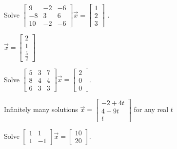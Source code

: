 \begin{exercise}
Solve
$\left[ \begin{smallmatrix}
9 & -2 & -6 \\
-8 & 3 & 6 \\
10 & -2 & -6
\end{smallmatrix} \right] \vec{x} =
\left[ \begin{smallmatrix}
1 \\
2 \\
3
\end{smallmatrix} \right]$ .
\end{exercise}
\comboSol{%
}
{%
$\vec{x} = \left[\begin{smallmatrix} 2 \\ 1 \\ \frac{5}{2} \end{smallmatrix}\right]$
}

\begin{exercise}
Solve
$\left[ \begin{smallmatrix}
5 & 3 & 7 \\
8 & 4 & 4 \\
6 & 3 & 3
\end{smallmatrix} \right] \vec{x} =
\left[ \begin{smallmatrix}
2 \\
0 \\
0
\end{smallmatrix} \right]$.
\end{exercise}
\comboSol{%
}
{%
Infinitely many solutions $\vec{x} = \left[\begin{smallmatrix} -2+4t \\ 4-9t \\ t \end{smallmatrix}\right]$ for any real $t$
}

\begin{exercise}\ansMark%
Solve
$\left[ \begin{smallmatrix}
1 & 1 \\
1 & -1
\end{smallmatrix}\right] \vec{x} = 
\left[ \begin{smallmatrix}
10 \\ 20
\end{smallmatrix}\right]$.
\end{exercise}



